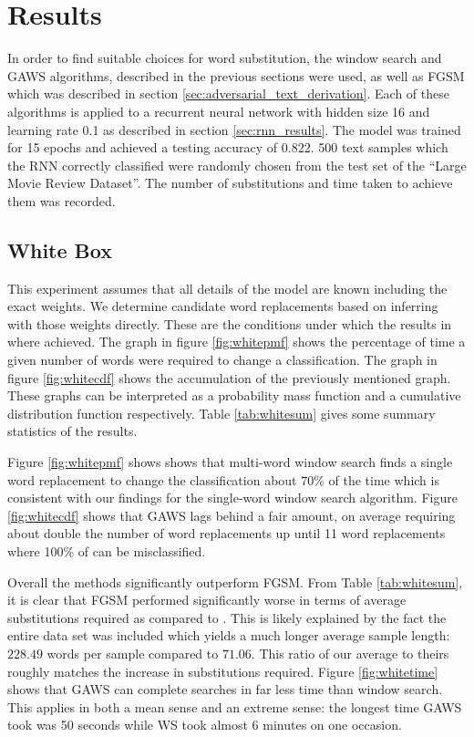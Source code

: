\chapter{Results}\label{chap:results}
In order to find suitable choices for word substitution, the window search and GAWS algorithms, described in the previous sections were used, as well as FGSM which was described in section \ref{sec:adversarial_text_derivation}.  Each of these algorithms is applied to a recurrent neural network with hidden size 16 and learning rate 0.1 as described in section \ref{sec:rnn_results}.  The model was trained for 15 epochs and achieved a testing accuracy of 0.822.  500 text samples which the RNN correctly classified were randomly chosen from the test set of the ``Large Movie Review Dataset''.  The number of substitutions and time taken to achieve them was recorded.


\section{White Box}
This experiment assumes that all details of the model are known including the exact weights.  We determine candidate word replacements based on inferring with those weights directly.  These are the conditions under which the results in \cite{np16} where achieved.  The graph in figure \ref{fig:whitepmf} shows the percentage of time a given number of words were required to change a classification.  The graph in figure \ref{fig:whitecdf} shows the accumulation of the previously mentioned graph.  These graphs can be interpreted as a probability mass function and a cumulative distribution function respectively.  Table \ref{tab:whitesum} gives some summary statistics of the results.

Figure \ref{fig:whitepmf} shows shows that multi-word window search finds a single word replacement to change the classification about $70\%$ of the time which is consistent with our findings for the single-word window search algorithm.  Figure \ref{fig:whitecdf} shows that GAWS lags behind a fair amount, on average requiring about double the number of word replacements up until 11 word replacements where 100\% of can be misclassified.  

Overall the methods significantly outperform FGSM.  From Table \ref{tab:whitesum}, it is clear that FGSM performed significantly worse in terms of average substitutions required as compared to \cite{np16}.  This is likely explained by the fact the entire data set was included which yields a much longer average sample length: $228.49$ words per sample compared to $71.06$.  This ratio of our average to theirs roughly matches the increase in substitutions required.  Figure \ref{fig:whitetime} shows that GAWS can complete searches in far less time than window search.  This applies in both a mean sense and an extreme sense: the longest time GAWS took was 50 seconds while WS took almost 6 minutes on one occasion.

